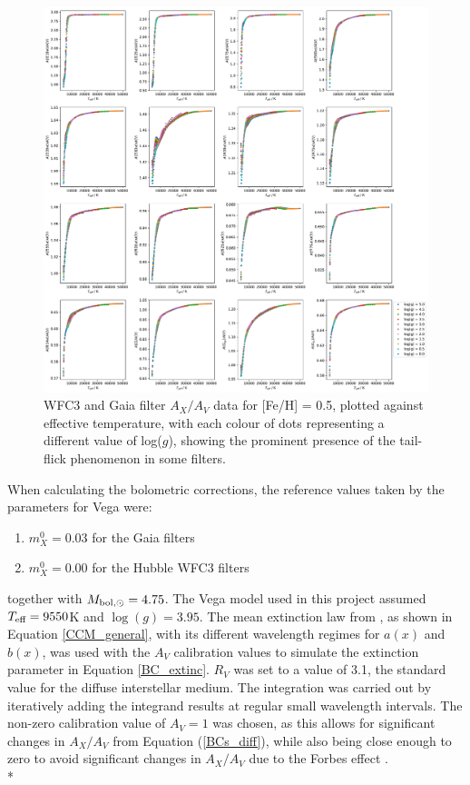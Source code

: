\documentclass[12pt, a4paper]{report}
\begin{document}
\begin{figure}[h]
\begin{center}
\includegraphics[scale=0.3]{../just_full_data/comb/AHub_FeH0p0_just_Teff_fit_plot_dots.pdf}
\caption{WFC3 and Gaia filter $A_{X}/A_{V}$ data for [Fe/H] = 0.5, plotted against effective temperature, with each colour of dots representing a different value of log($g$), showing the prominent presence of the tail-flick phenomenon in some filters.}
\label{comb Ax/Av data FeH=0}
\end{center}
\end{figure}

When calculating the bolometric corrections, the reference values taken by the parameters for Vega were:

\begin{enumerate}
\item $m_{X}^{0} = 0.03$ for the Gaia filters
\item $m_{X}^{0} = 0.00$ for the Hubble WFC3 filters
\end{enumerate}

together with $M_{\textnormal{bol},\odot} = 4.75$. The Vega model used in this project assumed $T_{\textnormal{eff}} = 9550$K and $\log(g) = 3.95$. The mean extinction law from \cite{1989ApJ...345..245C}, as shown in Equation \ref{CCM_general}, with its different wavelength regimes for $a(x)$ and $b(x)$, was used with the $A_{V}$ calibration values to simulate the extinction parameter in Equation \ref{BC_extinc}. $R_{V}$ was set to a value of 3.1, the standard value for the diffuse interstellar medium. The integration was carried out by iteratively adding the integrand results at regular small wavelength intervals. The non-zero calibration value of $A_{V} = 1$ was chosen, as this allows for significant changes in $A_{X}/A_{V}$ from Equation (\ref{BCs_diff}), while also being close enough to zero to avoid significant changes in $A_{X}/A_{V}$ due to the Forbes effect \citep{2008PASP..120..583G}.\\*
\end{document}
